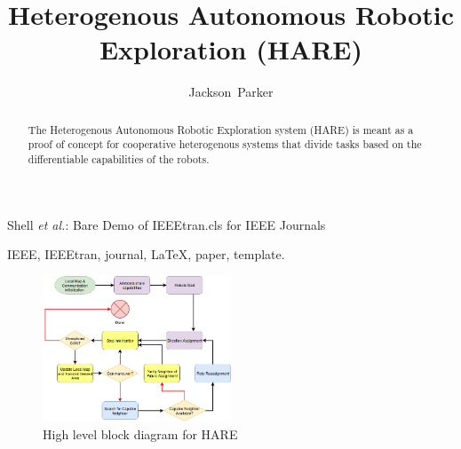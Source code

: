 \documentclass[conference]{IEEEtran}
\begin{document}
\onecolumn

\title{Heterogenous Autonomous Robotic Exploration (HARE)}

\author{Jackson~Parker}

%
{Shell \MakeLowercase{\textit{et al.}}: Bare Demo of IEEEtran.cls for IEEE Journals}











\maketitle

\begin{abstract}
  The Heterogenous Autonomous Robotic Exploration system (HARE) is meant as a proof
  of concept for cooperative heterogenous systems that divide tasks based on the
  differentiable capabilities of the robots.
\end{abstract}

\begin{IEEEkeywords}
IEEE, IEEEtran, journal, \LaTeX, paper, template.
\end{IEEEkeywords}


\IEEEpeerreviewmaketitle

\begin{figure}[H]
  \centering
    \includegraphics[width=0.5\textwidth]{HARE}
  \caption{High level block diagram for HARE}
  \label{fig:something3}
\end{figure}
\end{document}
